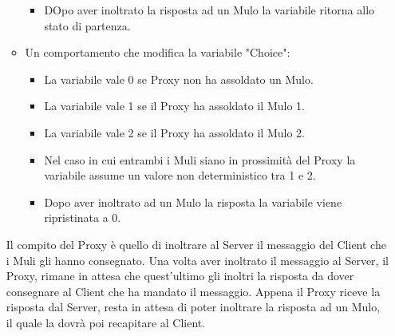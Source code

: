 \documentclass[13pt,a4paper]{article}
\begin{document}
\begin{itemize}
\begin{itemize}
\begin{itemize}
			\item DOpo aver inoltrato la risposta ad un Mulo la variabile ritorna allo stato di partenza.
		\end{itemize}
		\item Un comportamento che modifica la variabile "Choice":
		\begin{itemize}
			\item La variabile vale 0 se Proxy non ha assoldato un Mulo.
			\item La variabile vale 1 se  il Proxy ha assoldato il Mulo 1.
			\item La variabile vale 2 se  il Proxy ha assoldato il Mulo 2.
			\item Nel caso in cui entrambi i Muli siano in prossimità del Proxy la variabile assume un valore non deterministico tra 1 e 2.
			\item Dopo aver inoltrato ad un Mulo la risposta la variabile viene ripristinata a 0.
		\end{itemize}
	\end{itemize}
	Il compito del Proxy è quello di inoltrare al Server il messaggio del Client che i Muli gli hanno consegnato. Una volta aver inoltrato il messaggio al Server, il Proxy, rimane in attesa che quest'ultimo gli inoltri la risposta da dover consegnare al Client che ha mandato il messaggio. Appena il Proxy riceve la risposta dal Server, resta in attesa di poter inoltrare la risposta ad un Mulo, il quale la dovrà poi recapitare al Client.
	

\end{itemize}
\end{document}
